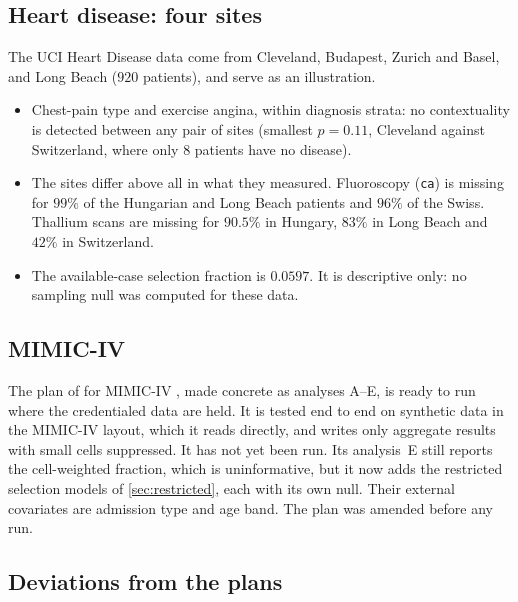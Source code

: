 \documentclass[11pt]{article}
\theoremstyle{definition}
\theoremstyle{remark}
\begin{document}
\subsection{Heart disease: four sites}

The UCI Heart Disease data \cite{Detrano1989,UCIHeart} come from Cleveland, Budapest, Zurich and Basel, and Long Beach ($920$ patients),
and serve as an illustration.
\begin{itemize}[leftmargin=*,nosep]
\item Chest-pain type and exercise angina, within diagnosis strata: no contextuality is detected between any pair of sites (smallest
  $p=0.11$, Cleveland against Switzerland, where only $8$ patients have no disease).
\item The sites differ above all in what they measured. Fluoroscopy (\texttt{ca}) is missing for $99\%$ of the Hungarian and Long Beach
  patients and $96\%$ of the Swiss. Thallium scans are missing for $90.5\%$ in Hungary, $83\%$ in Long Beach and $42\%$ in Switzerland.
\item The available-case selection fraction is $0.0597$. It is descriptive only: no sampling null was computed for these data.
\end{itemize}

\subsection{MIMIC-IV}

The plan of \cite[\S11]{Bands} for MIMIC-IV \cite{MIMICIV}, made concrete as analyses A--E, is ready to run where the credentialed data are
held. It is tested end to end on synthetic data in the MIMIC-IV layout, which it reads directly, and writes only aggregate results with
small cells suppressed. It has not yet been run. Its analysis~E still reports the cell-weighted fraction, which is uninformative, but it now
adds the restricted selection models of \cref{sec:restricted}, each with its own null. Their external covariates are admission type and age
band. The plan was amended before any run.

\subsection{Deviations from the plans}\label{sec:deviations}
\end{document}
